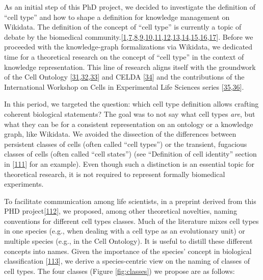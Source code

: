 As an initial step of this PhD project, we decided to investigate the definition of ``cell type'' and how to shape a definition for knowledge management on Wikidata.
The definition of the concept of ``cell type'' is currently a topic of debate by the biomedical community.{[}\protect\hyperlink{ref-pNGap1Du}{1},\protect\hyperlink{ref-paKiKTRS}{7},\protect\hyperlink{ref-sWv3okaH}{8},\protect\hyperlink{ref-19yYJWEkz}{9},\protect\hyperlink{ref-BlxFp1v3}{10},\protect\hyperlink{ref-eOUB1Bmj}{11},\protect\hyperlink{ref-TupzTvtA}{12},\protect\hyperlink{ref-w0Woz7JE}{13},\protect\hyperlink{ref-srfuRMe}{14},\protect\hyperlink{ref-1GXQByEaQ}{15},\protect\hyperlink{ref-k0Pe9YOB}{16},\protect\hyperlink{ref-MoaYZAA0}{17}{]}.
Before we proceeded with the knowledge-graph formalizations via Wikidata, we dedicated time for a theoretical research on the concept of ``cell type'' in the context of knowledge representation.
This line of research aligns itself with the groundwork of the Cell Ontology {[}\protect\hyperlink{ref-1CI8uS6ka}{31},\protect\hyperlink{ref-gAysgnsS}{32},\protect\hyperlink{ref-17U3pGEjv}{33}{]} and CELDA {[}\protect\hyperlink{ref-RLHsA1U8}{34}{]} and the contributions of the International Workshop on Cells in Experimental Life Sciences series {[}\protect\hyperlink{ref-jX2ZmXcc}{35},\protect\hyperlink{ref-rK8KD0us}{36}{]}.

In this period, we targeted the question: which cell type definition allows crafting coherent biological statements?
The goal was to not say what cell types \emph{are}, but what they can be for a consistent representation on an ontology or a knowledge graph, like Wikidata.
We avoided the dissection of the differences between persistent classes of cells (often called ``cell types'') or the transient, fugacious classes of cells (often called ``cell states'') (see ``Definition of cell identity'' section in {[}\protect\hyperlink{ref-pFijpXkl}{111}{]} for an example).
Even though such a distinction is an essential topic for theoretical research, it is not required to represent formally biomedical experiments.

To facilitate communication among life scientists, in a preprint derived from this PHD project{[}\protect\hyperlink{ref-uCE45Jh8}{112}{]}, we proposed, among other theoretical novelties, naming conventions for different cell types classes.
Much of the literature mixes cell types in one species (e.g., when dealing with a cell type as an evolutionary unit) or multiple species (e.g., in the Cell Ontology).
It is useful to distill these different concepts into names. Given the importance of the species' concept in biological classification {[}\protect\hyperlink{ref-AHGRV6KQ}{113}{]}, we derive a species-centric view on the naming of classes of cell types.
The four classes (Figure \ref{fig:classes}) we propose are as follows:

